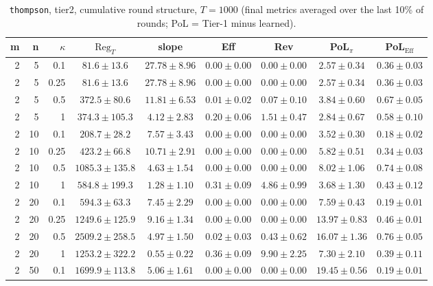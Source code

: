 \begin{table}[htbp]
\centering
\scriptsize
\caption{\texttt{thompson}, tier2, cumulative round structure, $T=1000$ (final metrics averaged over the last 10\% of rounds; PoL = Tier-1 minus learned).}
\label{tab:tier2_thompson_cumulative}
\begin{tabular}{@{}rrrcccccc@{}}
\toprule
m & n & $\kappa$ & $\mathrm{Reg}_T$ & slope & Eff & Rev & PoL$_\pi$ & PoL$_\mathrm{Eff}$ \\
\midrule
2 & 5 & 0.1 & $81.6 \pm 13.6$ & $27.78 \pm 8.96$ & $0.00 \pm 0.00$ & $0.00 \pm 0.00$ & $2.57 \pm 0.34$ & $0.36 \pm 0.03$ \\
2 & 5 & 0.25 & $81.6 \pm 13.6$ & $27.78 \pm 8.96$ & $0.00 \pm 0.00$ & $0.00 \pm 0.00$ & $2.57 \pm 0.34$ & $0.36 \pm 0.03$ \\
2 & 5 & 0.5 & $372.5 \pm 80.6$ & $11.81 \pm 6.53$ & $0.01 \pm 0.02$ & $0.07 \pm 0.10$ & $3.84 \pm 0.60$ & $0.67 \pm 0.05$ \\
2 & 5 & 1 & $374.3 \pm 105.3$ & $4.12 \pm 2.83$ & $0.20 \pm 0.06$ & $1.51 \pm 0.47$ & $2.84 \pm 0.67$ & $0.58 \pm 0.10$ \\
2 & 10 & 0.1 & $208.7 \pm 28.2$ & $7.57 \pm 3.43$ & $0.00 \pm 0.00$ & $0.00 \pm 0.00$ & $3.52 \pm 0.30$ & $0.18 \pm 0.02$ \\
2 & 10 & 0.25 & $423.2 \pm 66.8$ & $10.71 \pm 2.91$ & $0.00 \pm 0.00$ & $0.00 \pm 0.00$ & $5.82 \pm 0.51$ & $0.34 \pm 0.03$ \\
2 & 10 & 0.5 & $1085.3 \pm 135.8$ & $4.63 \pm 1.54$ & $0.00 \pm 0.00$ & $0.00 \pm 0.00$ & $8.02 \pm 1.06$ & $0.74 \pm 0.08$ \\
2 & 10 & 1 & $584.8 \pm 199.3$ & $1.28 \pm 1.10$ & $0.31 \pm 0.09$ & $4.86 \pm 0.99$ & $3.68 \pm 1.30$ & $0.43 \pm 0.12$ \\
2 & 20 & 0.1 & $594.3 \pm 63.3$ & $7.45 \pm 2.29$ & $0.00 \pm 0.00$ & $0.00 \pm 0.00$ & $7.59 \pm 0.43$ & $0.19 \pm 0.01$ \\
2 & 20 & 0.25 & $1249.6 \pm 125.9$ & $9.16 \pm 1.34$ & $0.00 \pm 0.00$ & $0.00 \pm 0.00$ & $13.97 \pm 0.83$ & $0.46 \pm 0.01$ \\
2 & 20 & 0.5 & $2509.2 \pm 258.5$ & $4.97 \pm 1.50$ & $0.02 \pm 0.03$ & $0.43 \pm 0.62$ & $16.07 \pm 1.36$ & $0.76 \pm 0.05$ \\
2 & 20 & 1 & $1253.2 \pm 322.2$ & $0.55 \pm 0.22$ & $0.36 \pm 0.09$ & $9.90 \pm 2.25$ & $7.30 \pm 2.10$ & $0.39 \pm 0.11$ \\
2 & 50 & 0.1 & $1699.9 \pm 113.8$ & $5.06 \pm 1.61$ & $0.00 \pm 0.00$ & $0.00 \pm 0.00$ & $19.45 \pm 0.56$ & $0.19 \pm 0.01$ \\

\end{tabular}
\end{table}
